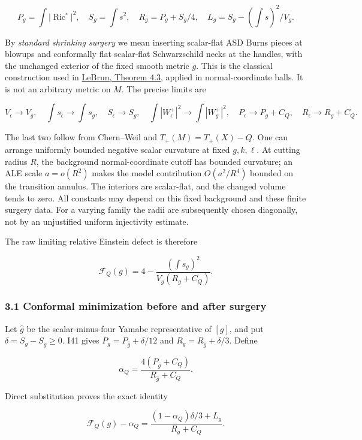 \documentclass[
  10pt,
]{article}
\begin{document}
\[
 P_g=\int|\operatorname{Ric}^{\circ}|^2,\quad
 S_g=\int s^2,\quad R_g=P_g+S_g/4,
 \quad L_g=S_g-(\int s)^2/V_g.
\]

By \emph{standard shrinking surgery} we mean inserting scalar-flat ASD
Burns pieces at blowups and conformally flat scalar-flat Schwarzschild
necks at the handles, with the unchanged exterior of the fixed smooth
metric \(g\). This is the classical construction used in
\href{https://arxiv.org/html/math/0003068}{LeBrun, Theorem 4.3}, applied
in normal-coordinate balls. It is not an arbitrary metric on \(M\). The
precise limits are

\[
 V_\epsilon\to V_g,\quad \int s_\epsilon\to\int s_g,
 \quad S_\epsilon\to S_g,\quad
 \int|W_\epsilon^+|^2\to\int|W_g^+|^2,
 \quad P_\epsilon\to P_g+C_Q,\quad R_\epsilon\to R_g+C_Q.
 \tag{3.1}
\]

The last two follow from Chern--Weil and \(T_+(M)=T_+(X)-Q\). One can
arrange uniformly bounded negative scalar curvature at fixed
\(g,k,\ell\). At cutting radius \(R\), the background normal-coordinate
cutoff has bounded curvature; an ALE scale \(a=o(R^2)\) makes the model
contribution \(O(a^2/R^4)\) bounded on the transition annulus. The
interiors are scalar-flat, and the changed volume tends to zero. All
constants may depend on this fixed background and these finite surgery
data. For a varying family the radii are subsequently chosen diagonally,
not by an unjustified uniform injectivity estimate.

The raw limiting relative Einstein defect is therefore

\[
 \mathcal F_Q(g)=4-\frac{(\int s_g)^2}{V_g(R_g+C_Q)}.
 \tag{3.2}
\]

\hypertarget{conformal-minimization-before-and-after-surgery}{%
\subsubsection{3.1 Conformal minimization before and after
surgery}\label{conformal-minimization-before-and-after-surgery}}

Let \(\widehat g\) be the scalar-minus-four Yamabe representative of
\([g]\), and put \(\delta=S_g-S_{\widehat g}\ge0\). I41 gives
\(P_g=P_{\widehat g}+\delta/12\) and \(R_g=R_{\widehat g}+\delta/3\).
Define

\[
 \alpha_Q=\frac{4(P_{\widehat g}+C_Q)}{R_{\widehat g}+C_Q}.
\]

Direct substitution proves the exact identity

\[
 \boxed{\mathcal F_Q(g)-\alpha_Q
 =\frac{(1-\alpha_Q)\delta/3+L_g}{R_g+C_Q}.}
 \tag{3.3}
\]
\end{document}
